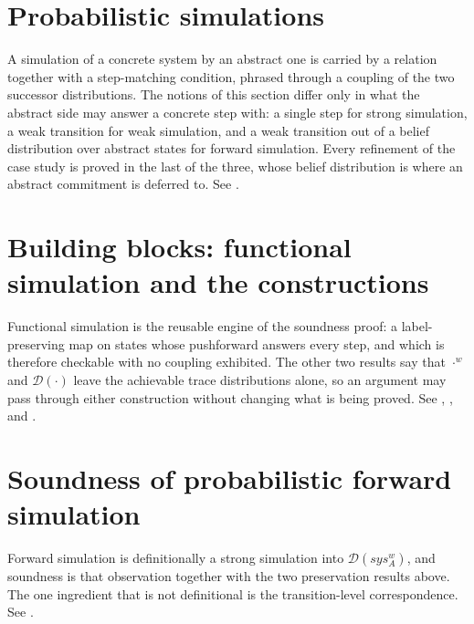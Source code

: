 





\section{Probabilistic simulations}

A simulation of a concrete system by an abstract one is carried by a relation together with a step-matching condition, phrased through a coupling of the two successor distributions.
The notions of this section differ only in what the abstract side may answer a concrete step with: a single step for strong simulation, a weak transition for weak simulation, and a weak transition out of a belief distribution over abstract states for forward simulation.
Every refinement of the case study is proved in the last of the three, whose belief distribution is where an abstract commitment is deferred to.
See .





\section{Building blocks: functional simulation and the constructions}

Functional simulation is the reusable engine of the soundness proof: a label-preserving map on states whose pushforward answers every step, and which is therefore checkable with no coupling exhibited.
The other two results say that $\cdot^w$ and $\mathcal{D}(\cdot)$ leave the achievable trace distributions alone, so an argument may pass through either construction without changing what is being proved.
See , ,  and .






\section{Soundness of probabilistic forward simulation}
\label{sec:soundness}

Forward simulation is definitionally a strong simulation into $\mathcal{D}(sys_A^w)$, and soundness is that observation together with the two preservation results above.
The one ingredient that is not definitional is the transition-level correspondence.
See .

